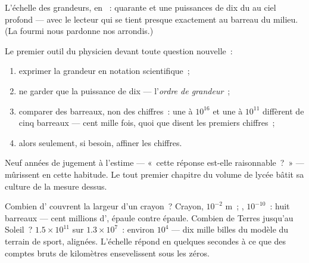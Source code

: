 \begin{omfigure}

{\small L'échelle des grandeurs, en ~: quarante et une
puissances de dix du  au ciel profond --- avec le lecteur qui se
tient presque exactement au barreau du milieu. (La fourmi nous
pardonne nos arrondis.)}
\end{omfigure}

\begin{method}\label{met:g9:atoms-to-galaxies:oom}
Le premier outil du physicien devant toute question nouvelle~:
\begin{enumerate}
  \item exprimer la grandeur en notation scientifique~;
  \item ne garder que la puissance de dix --- l'\emph{ordre de
        grandeur}~;
  \item comparer des barreaux, non des chiffres~: une  à
        $10^{16}$  et une  à $10^{11}$ diffèrent de
        cinq barreaux --- cent mille fois, quoi que disent les
        premiers chiffres~;
  \item alors seulement, si besoin, affiner les chiffres.
\end{enumerate}
Neuf années de jugement à l'estime --- «~cette réponse est-elle
raisonnable~?~» --- mûrissent en cette habitude. Le tout premier
chapitre du volume de lycée bâtit sa culture de la mesure dessus.
\end{method}

\begin{example}\label{ex:g9:atoms-to-galaxies:arithmetic}
Combien d' couvrent la largeur d'un crayon~? Crayon, $10^{-2}$
\unit{m}~; , $10^{-10}$~: huit barreaux --- cent millions
d', épaule contre épaule. Combien de Terres jusqu'au Soleil~?
$1.5 \times 10^{11}$ sur $1.3 \times 10^{7}$~: environ $10^{4}$ ---
dix mille billes du modèle du terrain de sport, alignées. L'échelle
répond en quelques secondes à ce que des comptes bruts de kilomètres
ensevelissent sous les zéros.
\end{example}

